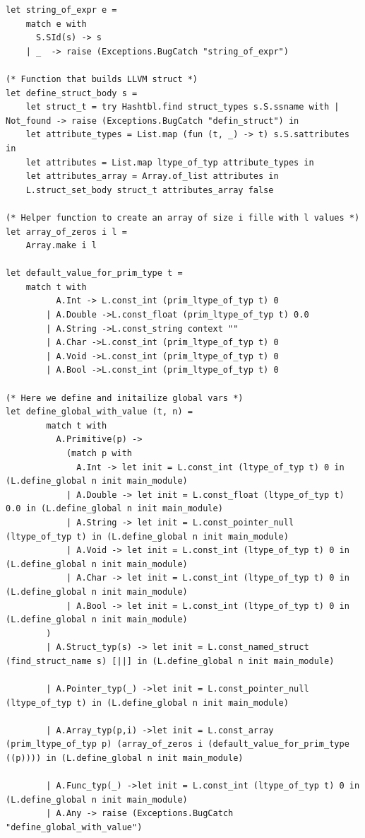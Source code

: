 \documentclass{article}
\begin{document}
\begin{lstlisting}
let string_of_expr e =
	match e with
	  S.SId(s) -> s
	| _  -> raise (Exceptions.BugCatch "string_of_expr")

(* Function that builds LLVM struct *)
let define_struct_body s =
	let struct_t = try Hashtbl.find struct_types s.S.ssname with | Not_found -> raise (Exceptions.BugCatch "defin_struct") in
	let attribute_types = List.map (fun (t, _) -> t) s.S.sattributes in
	let attributes = List.map ltype_of_typ attribute_types in		
	let attributes_array = Array.of_list attributes in 
	L.struct_set_body struct_t attributes_array false

(* Helper function to create an array of size i fille with l values *)
let array_of_zeros i l = 
	Array.make i l

let default_value_for_prim_type t = 
	match t with 
		  A.Int -> L.const_int (prim_ltype_of_typ t) 0
		| A.Double ->L.const_float (prim_ltype_of_typ t) 0.0
		| A.String ->L.const_string context "" 
		| A.Char ->L.const_int (prim_ltype_of_typ t) 0
		| A.Void ->L.const_int (prim_ltype_of_typ t) 0
		| A.Bool ->L.const_int (prim_ltype_of_typ t) 0

(* Here we define and initailize global vars *)
let define_global_with_value (t, n) = 
		match t with 
		  A.Primitive(p) -> 
			(match p with
			  A.Int -> let init = L.const_int (ltype_of_typ t) 0 in (L.define_global n init main_module)
			| A.Double -> let init = L.const_float (ltype_of_typ t) 0.0 in (L.define_global n init main_module)
			| A.String -> let init = L.const_pointer_null (ltype_of_typ t) in (L.define_global n init main_module)		
			| A.Void -> let init = L.const_int (ltype_of_typ t) 0 in (L.define_global n init main_module)
			| A.Char -> let init = L.const_int (ltype_of_typ t) 0 in (L.define_global n init main_module)
			| A.Bool -> let init = L.const_int (ltype_of_typ t) 0 in (L.define_global n init main_module)
		)
		| A.Struct_typ(s) -> let init = L.const_named_struct (find_struct_name s) [||] in (L.define_global n init main_module)		

		| A.Pointer_typ(_) ->let init = L.const_pointer_null (ltype_of_typ t) in (L.define_global n init main_module)		

		| A.Array_typ(p,i) ->let init = L.const_array (prim_ltype_of_typ p) (array_of_zeros i (default_value_for_prim_type ((p)))) in (L.define_global n init main_module)		

		| A.Func_typ(_) ->let init = L.const_int (ltype_of_typ t) 0 in (L.define_global n init main_module)		
		| A.Any -> raise (Exceptions.BugCatch "define_global_with_value")



\end{lstlisting}
\end{document}
